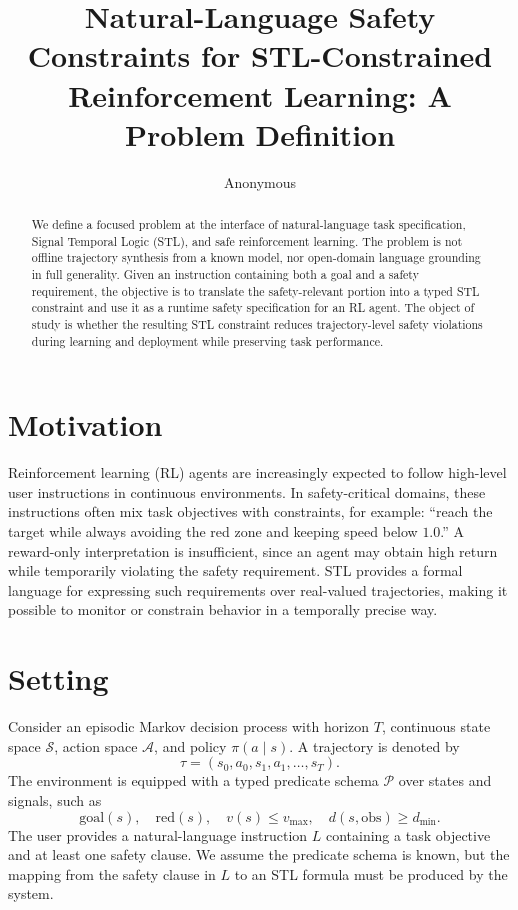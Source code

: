 \documentclass[letterpaper,10pt,twocolumn]{article}
\title{\vspace{-0.45in}\bfseries Natural-Language Safety Constraints for STL-Constrained Reinforcement Learning: A Problem Definition}
\author{Anonymous}
\date{}
\begin{document}
\maketitle
\vspace{-0.28in}

\begin{abstract}
We define a focused problem at the interface of natural-language task specification, Signal Temporal Logic (STL), and safe reinforcement learning. The problem is not offline trajectory synthesis from a known model, nor open-domain language grounding in full generality. Given an instruction containing both a goal and a safety requirement, the objective is to translate the safety-relevant portion into a typed STL constraint and use it as a runtime safety specification for an RL agent. The object of study is whether the resulting STL constraint reduces trajectory-level safety violations during learning and deployment while preserving task performance.
\end{abstract}

\section{Motivation}
Reinforcement learning (RL) agents are increasingly expected to follow high-level user instructions in continuous environments. In safety-critical domains, these instructions often mix task objectives with constraints, for example: ``reach the target while always avoiding the red zone and keeping speed below $1.0$.'' A reward-only interpretation is insufficient, since an agent may obtain high return while temporarily violating the safety requirement. STL provides a formal language for expressing such requirements over real-valued trajectories, making it possible to monitor or constrain behavior in a temporally precise way.

\section{Setting}
Consider an episodic Markov decision process with horizon $T$, continuous state space $\mathcal{S}$, action space $\mathcal{A}$, and policy $\pi(a \mid s)$. A trajectory is denoted by
\[
\tau = (s_0,a_0,s_1,a_1,\ldots,s_T).
\]
The environment is equipped with a typed predicate schema $\mathcal{P}$ over states and signals, such as
\[
\mathrm{goal}(s),\quad \mathrm{red}(s),\quad v(s) \leq v_{\max},\quad d(s,\mathrm{obs}) \geq d_{\min}.
\]
The user provides a natural-language instruction $L$ containing a task objective and at least one safety clause. We assume the predicate schema is known, but the mapping from the safety clause in $L$ to an STL formula must be produced by the system.
\end{document}
